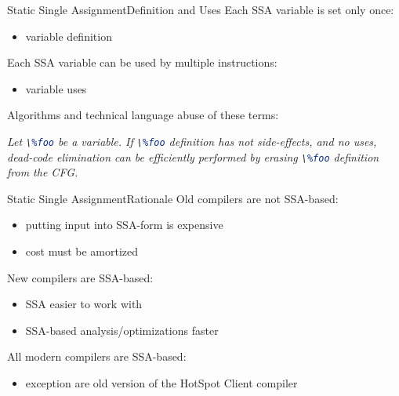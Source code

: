 \documentclass[10pt,mathserif]{beamer}
\newcommand{\llvminline}[1]{\lstinline[language=LLVM]!#1!}
\begin{document}
\begin{frame}{Static Single Assignment}{Definition and Uses}
Each SSA variable is set only once:

\begin{itemize}
\item variable \alert{definition}
\end{itemize}

Each SSA variable can be used by multiple instructions:

\begin{itemize}
\item variable \alert{uses}
\end{itemize}

Algorithms and technical language abuse of these terms:

\bigskip
\emph{
Let \llvminline{\%foo} be a variable. If \llvminline{\%foo} definition has not
side-effects, and no uses, dead-code elimination can be efficiently performed
by erasing \llvminline{\%foo} definition from the CFG.
}
\end{frame}

\begin{frame}{Static Single Assignment}{Rationale}
Old compilers are not SSA-based:

\begin{itemize}
\item putting input into SSA-form is expensive
\item cost must be amortized
\end{itemize}

New compilers are SSA-based:

\begin{itemize}
\item SSA easier to work with
\item SSA-based analysis/optimizations faster
\end{itemize}

All modern compilers are SSA-based:

\begin{itemize}
\item exception are old version of the HotSpot Client compiler
\end{itemize}
\end{frame}
\end{document}
